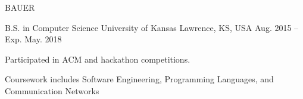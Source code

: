 \documentclass[11pt]{resume}
\begin{document}
\makecvheader[C]

\makecvfooter
  {BAUER}
  {\thepage}
  {\pageref{LastPage}}




\begin{cventries}
  \cventry
    {B.S. in Computer Science}
    {University of Kansas}
    {Lawrence, KS, USA}
    {Aug. 2015 – Exp. May. 2018}
    {
      \begin{cvitems}
      \item {
          Participated in ACM and hackathon competitions.
        }
      \item { Coursework includes Software Engineering, Programming Languages,
          and Communication Networks }
      \end{cvitems}
    }

\end{cventries}

\end{document}

